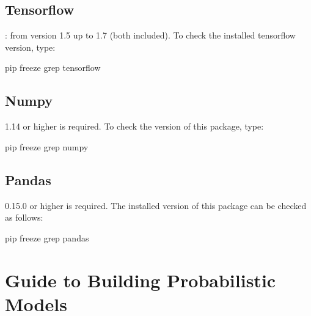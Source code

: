\documentclass[letterpaper,10pt,english]{sphinxmanual}
\begin{document}
\section{Tensorflow}
\label{\detokenize{notes/requirements:tensorflow}}
: from version 1.5 up to 1.7 (both included). To check the installed tensorflow version, type:

\begin{sphinxVerbatim}[commandchars=\\\{\}]
\PYGZdl{} pip freeze \textbar{} grep tensorflow
\end{sphinxVerbatim}


\section{Numpy}
\label{\detokenize{notes/requirements:numpy}}
 1.14 or higher is required. To check the version of this package, type:

\begin{sphinxVerbatim}[commandchars=\\\{\}]
\PYGZdl{} pip freeze \textbar{} grep numpy
\end{sphinxVerbatim}


\section{Pandas}
\label{\detokenize{notes/requirements:pandas}}
 0.15.0 or higher is required. The installed version of this package can be checked as follows:

\begin{sphinxVerbatim}[commandchars=\\\{\}]
\PYGZdl{} pip freeze \textbar{} grep pandas
\end{sphinxVerbatim}


\chapter{Guide to Building Probabilistic Models}
\label{\detokenize{notes/guidemodels:guide-to-building-probabilistic-models}}\label{\detokenize{notes/guidemodels::doc}}
\end{document}
